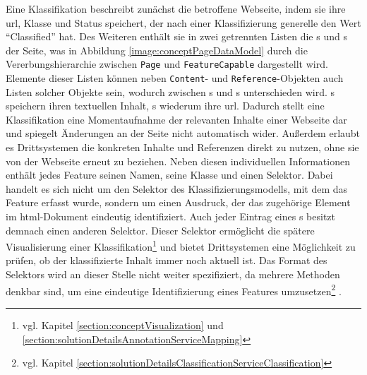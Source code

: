         Eine Klassifikation beschreibt zunächst die betroffene Webseite,
        indem sie ihre \gls{url}, Klasse und Status speichert,
        der nach einer Klassifizierung generelle den Wert "`Classified"' hat.       
        Des Weiteren enthält sie in zwei getrennten Listen die {\contentFeature}s
        und {}s der Seite, was in Abbildung \ref{image:conceptPageDataModel}
        durch die Vererbungshierarchie zwischen \texttt{Page} und \texttt{FeatureCapable}
        dargestellt wird.
        Elemente dieser Listen können neben \texttt{Content}- und \texttt{Reference}-Objekten
        auch Listen solcher Objekte sein,
        wodurch zwischen {\scalarFeature}s und {\collectionFeature}s unterschieden wird.
        {\contentFeature}s speichern ihren textuellen Inhalt,
        {}s wiederum ihre \gls{url}.
        Dadurch stellt eine Klassifikation eine Momentaufnahme der relevanten Inhalte
        einer Webseite dar und spiegelt Änderungen an der Seite nicht
        automatisch wider.
        Außerdem erlaubt es Drittsystemen die konkreten Inhalte und Referenzen
        direkt zu nutzen, ohne sie von der Webseite erneut zu beziehen.
        Neben diesen individuellen Informationen enthält jedes Feature
        seinen Namen, seine Klasse und einen Selektor.
        Dabei handelt es sich nicht um den Selektor des Klassifizierungsmodells,
        mit dem das Feature erfasst wurde,
        sondern um einen Ausdruck, der das zugehörige Element im \gls{html}-Dokument eindeutig identifiziert.
        Auch jeder Eintrag eines {\collectionFeature}s besitzt demnach einen anderen Selektor.
        Dieser Selektor ermöglicht die spätere Visualisierung einer
        Klassifikation\footnote{vgl. Kapitel \ref{section:conceptVisualization} und
        \ref{section:solutionDetailsAnnotationServiceMapping}}
        und bietet Drittsystemen eine Möglichkeit zu prüfen,
        ob der klassifizierte Inhalt immer noch aktuell ist.
        Das Format des Selektors wird an dieser Stelle nicht weiter spezifiziert,
        da mehrere Methoden denkbar sind, um eine eindeutige Identifizierung eines Features
        umzusetzen\footnote{vgl. Kapitel \ref{section:solutionDetailsClassificationServiceClassification}} .
